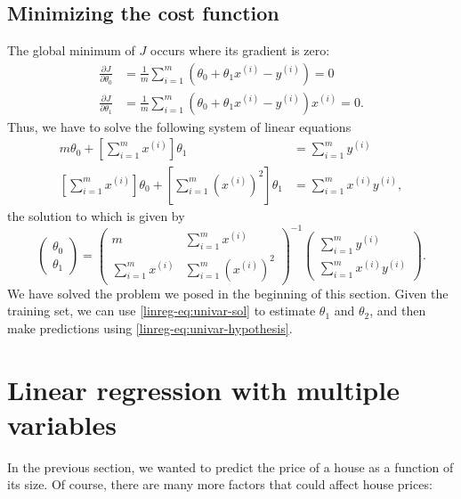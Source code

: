 \documentclass{article}
\theoremstyle{definition}
\begin{document}
\subsection{Minimizing the cost function}
The global minimum of $J$ occurs where its gradient is zero:
\begin{align*}
    \frac{\partial J}{\partial\theta_0} &= \frac{1}{m}\sum_{i=1}^{m}(\theta_0 + \theta_1 x^{(i)} - y^{(i)}) = 0 \\
    \frac{\partial J}{\partial\theta_1} &= \frac{1}{m}\sum_{i=1}^{m}(\theta_0 + \theta_1 x^{(i)} - y^{(i)})x^{(i)} = 0.
\end{align*}
Thus, we have to solve the following system of linear equations
\begin{align*}
    m \theta_0 + \left[\sum_{i=1}^{m}x^{(i)}\right]\theta_1 &= \sum_{i=1}^{m} y^{(i)}\\
    \left[\sum_{i=1}^{m}x^{(i)}\right] \theta_0 + \left[\sum_{i=1}^{m}\left(x^{(i)}\right)^2\right]\theta_1 &= \sum_{i=1}^{m} x^{(i)}y^{(i)},
\end{align*}
the solution to which is given by
\begin{equation}
\begin{pmatrix}
\theta_0\\
\theta_1
\end{pmatrix}
=
\begin{pmatrix}
m & \sum_{i=1}^{m}x^{(i)}\\
\sum_{i=1}^{m}x^{(i)} & \sum_{i=1}^{m}\left(x^{(i)}\right)^2
\end{pmatrix}^{-1}
\begin{pmatrix}
\sum_{i=1}^{m}y^{(i)}\\
\sum_{i=1}^{m}x^{(i)}y^{(i)}
\end{pmatrix}.
\label{linreg-eq:univar-sol}
\end{equation}
We have solved the problem we posed in the beginning of this section. Given the training set, we can use \eqref{linreg-eq:univar-sol} to estimate $\theta_1$ and $\theta_2$, and then make predictions using \eqref{linreg-eq:univar-hypothesis}.


\section{Linear regression with multiple variables}
In the previous section, we wanted to predict the price of a house as a function of its size. Of course, there are many more factors that could affect house prices:
\end{document}
